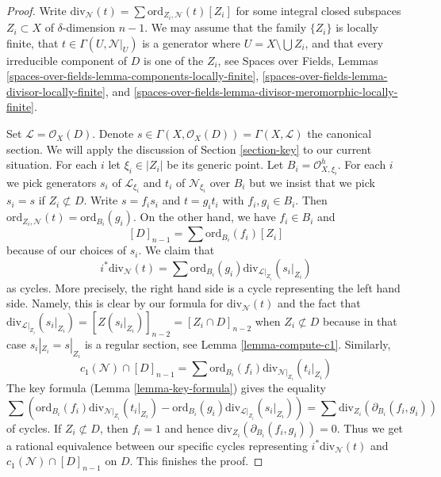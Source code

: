 \documentclass[10pt,a4paper]{amsart}
\theoremstyle{plain}
\theoremstyle{definition}
\theoremstyle{remark}
\numberwithin{equation}{subsection}
\begin{document}
\begin{proof}
Write $\text{div}_\mathcal{N}(t) = \sum \text{ord}_{Z_i, \mathcal{N}}(t)[Z_i]$
for some integral closed subspaces $Z_i \subset X$ of $\delta$-dimension
$n - 1$. We may assume that the family $\{Z_i\}$ is locally
finite, that $t \in \Gamma(U, \mathcal{N}|_U)$ is a generator
where $U = X \setminus \bigcup Z_i$, and that every irreducible component
of $D$ is one of the $Z_i$, see
Spaces over Fields, Lemmas
\ref{spaces-over-fields-lemma-components-locally-finite},
\ref{spaces-over-fields-lemma-divisor-locally-finite}, and
\ref{spaces-over-fields-lemma-divisor-meromorphic-locally-finite}.

\medskip\noindent
Set $\mathcal{L} = \mathcal{O}_X(D)$. Denote
$s \in \Gamma(X, \mathcal{O}_X(D)) = \Gamma(X, \mathcal{L})$
the canonical section. We will apply the discussion of
Section \ref{section-key} to our current situation.
For each $i$ let $\xi_i \in |Z_i|$ be its generic point. Let
$B_i = \mathcal{O}_{X, \xi_i}^h$. For each $i$ we pick generators
$s_i$ of $\mathcal{L}_{\xi_i}$ and $t_i$ of $\mathcal{N}_{\xi_i}$
over $B_i$ but we insist that we pick $s_i = s$ if $Z_i \not \subset D$.
Write $s = f_i s_i$ and $t = g_i t_i$ with $f_i, g_i \in B_i$.
Then $\text{ord}_{Z_i, \mathcal{N}}(t) = \text{ord}_{B_i}(g_i)$.
On the other hand, we have $f_i \in B_i$ and
$$
[D]_{n - 1} = \sum \text{ord}_{B_i}(f_i)[Z_i]
$$
because of our choices of $s_i$. We claim that
$$
i^*\text{div}_\mathcal{N}(t) =
\sum \text{ord}_{B_i}(g_i) \text{div}_{\mathcal{L}|_{Z_i}}(s_i|_{Z_i})
$$
as cycles. More precisely, the right hand side is a cycle
representing the left hand side. Namely, this is clear by our
formula for $\text{div}_\mathcal{N}(t)$ and the fact that
$\text{div}_{\mathcal{L}|_{Z_i}}(s_i|_{Z_i}) = [Z(s_i|_{Z_i})]_{n - 2} =
[Z_i \cap D]_{n - 2}$ when $Z_i \not \subset D$ because in
that case $s_i|_{Z_i} = s|_{Z_i}$ is a regular section, see
Lemma \ref{lemma-compute-c1}. Similarly,
$$
c_1(\mathcal{N}) \cap [D]_{n - 1} =
\sum \text{ord}_{B_i}(f_i) \text{div}_{\mathcal{N}|_{Z_i}}(t_i|_{Z_i})
$$
The key formula (Lemma \ref{lemma-key-formula}) gives the equality
$$
\sum \left(
\text{ord}_{B_i}(f_i) \text{div}_{\mathcal{N}|_{Z_i}}(t_i|_{Z_i}) -
\text{ord}_{B_i}(g_i) \text{div}_{\mathcal{L}|_{Z_i}}(s_i|_{Z_i}) \right) =
\sum \text{div}_{Z_i}(\partial_{B_i}(f_i, g_i))
$$
of cycles. If $Z_i \not \subset D$, then $f_i = 1$ and hence
$\text{div}_{Z_i}(\partial_{B_i}(f_i, g_i)) = 0$. Thus we get a rational
equivalence between our specific cycles representing
$i^*\text{div}_\mathcal{N}(t)$ and $c_1(\mathcal{N}) \cap [D]_{n - 1}$
on $D$. This finishes the proof.
\end{proof}
\end{document}
